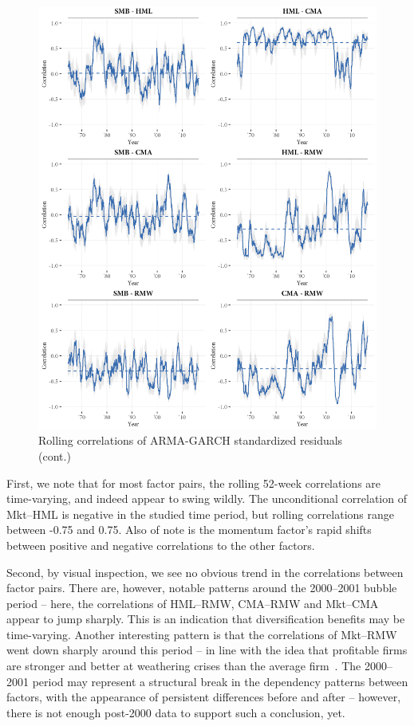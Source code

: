 \begin{figure}[!p]
  \ContinuedFloat
  \centering
  \includegraphics[scale=1]{graphics/rolling2.png}  
  \footnotesize
  \caption{Rolling correlations of ARMA-GARCH standardized residuals (cont.)}
\end{figure}
First, we note that for most factor pairs, the rolling 52-week correlations are time-varying, and indeed appear to swing wildly. The unconditional correlation of Mkt--HML is negative in the studied time period, but rolling correlations range between -0.75 and 0.75. Also of note is the momentum factor's rapid shifts between positive and negative correlations to the other factors. 

Second, by visual inspection, we see no obvious trend in the correlations between factor pairs. There are, however, notable patterns around the 2000--2001 bubble period -- here, the correlations of HML--RMW, CMA--RMW and Mkt--CMA appear to jump sharply. This is an indication that diversification benefits may be time-varying. Another interesting pattern is that the correlations of Mkt--RMW went down sharply around this period -- in line with the idea that profitable firms are stronger and better at weathering crises than the average firm~\autocite{NovyMarx2013}. The 2000--2001 period may represent a structural break in the dependency patterns between factors, with the appearance of persistent differences before and after -- however, there is not enough post-2000 data to support such a conclusion, yet.

